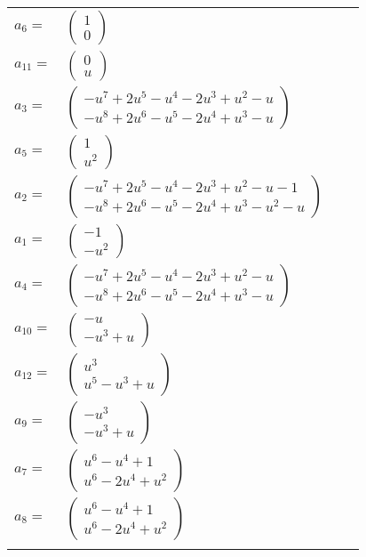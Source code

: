 \documentclass[1p]{elsarticle_modified}
\theoremstyle{definition}
\begin{document}
\begin{tabular}{m{7pt} m{180pt} m{7pt} m{180pt} }
\flushright $a_{6}=$&$\begin{pmatrix}1\\0\end{pmatrix}$ \\
\flushright $a_{11}=$&$\begin{pmatrix}0\\u\end{pmatrix}$ \\
\flushright $a_{3}=$&$\begin{pmatrix}- u^7+2 u^5- u^4-2 u^3+u^2- u\\- u^8+2 u^6- u^5-2 u^4+u^3- u\end{pmatrix}$ \\
\flushright $a_{5}=$&$\begin{pmatrix}1\\u^2\end{pmatrix}$ \\
\flushright $a_{2}=$&$\begin{pmatrix}- u^7+2 u^5- u^4-2 u^3+u^2- u-1\\- u^8+2 u^6- u^5-2 u^4+u^3- u^2- u\end{pmatrix}$ \\
\flushright $a_{1}=$&$\begin{pmatrix}-1\\- u^2\end{pmatrix}$ \\
\flushright $a_{4}=$&$\begin{pmatrix}- u^7+2 u^5- u^4-2 u^3+u^2- u\\- u^8+2 u^6- u^5-2 u^4+u^3- u\end{pmatrix}$ \\
\flushright $a_{10}=$&$\begin{pmatrix}- u\\- u^3+u\end{pmatrix}$ \\
\flushright $a_{12}=$&$\begin{pmatrix}u^3\\u^5- u^3+u\end{pmatrix}$ \\
\flushright $a_{9}=$&$\begin{pmatrix}- u^3\\- u^3+u\end{pmatrix}$ \\
\flushright $a_{7}=$&$\begin{pmatrix}u^6- u^4+1\\u^6-2 u^4+u^2\end{pmatrix}$ \\
\flushright $a_{8}=$&$\begin{pmatrix}u^6- u^4+1\\u^6-2 u^4+u^2\end{pmatrix}$\\&\end{tabular}
\end{document}
